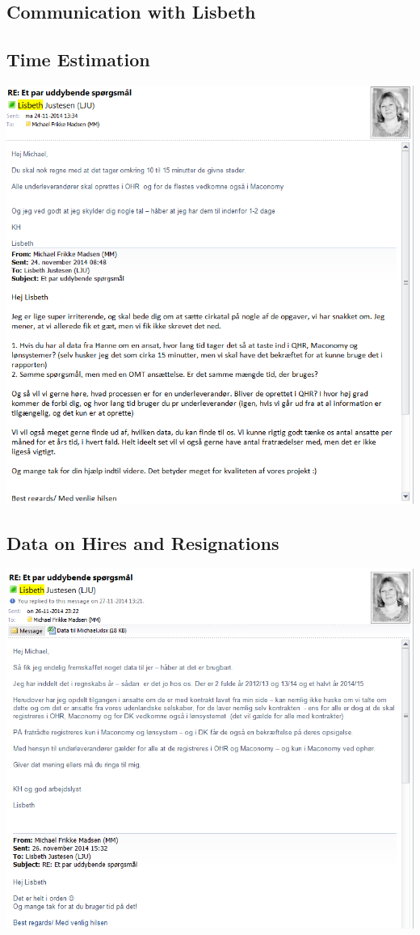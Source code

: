 \begin{linenumbers*}
\section{Communication with Lisbeth}

\subsection{Time Estimation}
\label{app:lisbeth_time_estimation}
\includegraphics[width=1.36\textwidth]{appendix/lisbeth_communication_1}

\subsection{Data on Hires and Resignations}
\label{app:hires_and_resignations}
\includegraphics[width=1.36\textwidth]{appendix/lisbeth_communication_2}



\end{linenumbers*}

